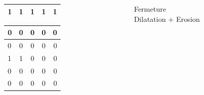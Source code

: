\documentclass[french]{beamer}
\begin{document}
\begin{frame}
\begin{columns}[T]
\begin{column}{3cm}
\begin{tabular}{|l|c|c|c|r|}
				1 & 1 & 1 & 1 & 1 \\
				\hline
			\end{tabular}
			\begin{tabular}{|l|c|c|c|r|}
				\hline
				0 & 0 & 0 & 0 & 0 \\ \hline
				0 & 0 & 0 & 0 & 0 \\ \hline
				1 & 1 & 0 & 0 & 0 \\ \hline
				0 & 0 & 0 & 0 & 0 \\ \hline
				0 & 0 & 0 & 0 & 0 \\
				\hline
			\end{tabular}
		\end{column}
		\begin{column}{3cm}
			Fermeture \\
			\bigskip
			Dilatation + Erosion
		\end{column}
	\end{columns}
\end{frame}
\end{document}
